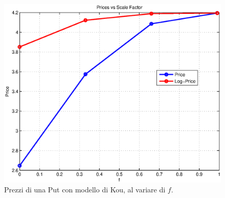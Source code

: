 \documentclass[a4paper,10pt]{report}
\theoremstyle{plain}
\theoremstyle{definition}
\theoremstyle{remark}
\begin{document}
\begin{figure}[htp!]
\begin{center}
\includegraphics[width=12cm]{img/test2-scalefactor.eps}
\caption{Prezzi di una Put con modello di Kou, al variare di $f$.}
\label{fig:test2-scalefactor}
\end{center}
\end{figure}
\end{document}
